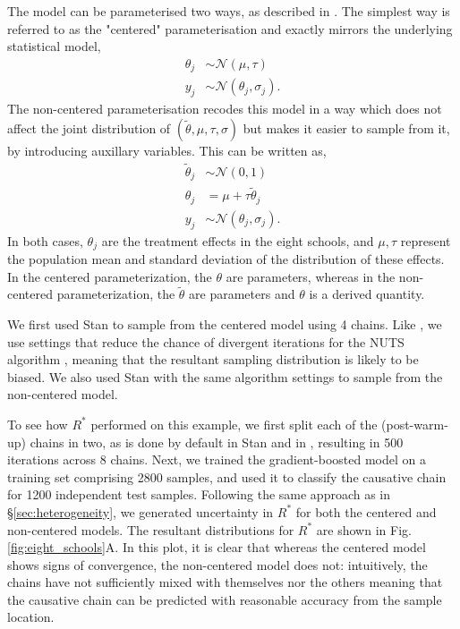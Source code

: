 \documentclass{article}
\newcommand{\N}{\mathcal{N}}
\begin{document}
The model can be parameterised two ways, as described in \cite{vehtari2019rank}. The simplest way is referred to as the "centered" parameterisation and exactly mirrors the underlying statistical model,
%
\begin{align*}
\theta_j &\sim \N(\mu, \tau) \\
y_j &\sim \N(\theta_j, \sigma_j).
\end{align*}
%
The non-centered parameterisation recodes this model in a way which does not affect the joint distribution of $(\tilde{\theta}, \mu, \tau, \sigma)$ but makes it easier to sample from it, by introducing auxillary variables. This can be written as,
%
\begin{align*}
\tilde{\theta}_j &\sim \N(0, 1) \\
\theta_j &= \mu + \tau \tilde{\theta}_j \\
y_j &\sim \N(\theta_j, \sigma_j).
\end{align*}
%
In both cases, $\theta_j$ are the treatment effects in the eight schools, and $\mu, \tau$ represent the population mean and standard deviation 
of the distribution of these effects. In the centered parameterization, the $\theta$ are parameters, whereas in the non-centered parameterization, the $\tilde{\theta}$ are parameters and $\theta$ is a derived quantity.

We first used Stan \cite{carpenter2017stan} to sample from the centered model using 4 chains. Like \cite{vehtari2019rank}, we use settings that reduce the chance of divergent iterations for the NUTS algorithm \cite{hoffman2014no}, meaning that the resultant sampling distribution is likely to be biased. We also used Stan with the same algorithm settings to sample from the non-centered model.

To see how $R^*$ performed on this example, we first split each of the (post-warm-up) chains in two, as is done by default in Stan \cite{carpenter2017stan} and in \cite{vehtari2019rank}, resulting in 500 iterations across 8 chains. Next, we trained the gradient-boosted model on a training set comprising 2800 samples, and used it to classify the causative chain for 1200 independent test samples. Following the same approach as in \S\ref{sec:heterogeneity}, we generated uncertainty in $R^*$ for both the centered and non-centered models. The resultant distributions for $R^*$ are shown in Fig.\ref{fig:eight_schools}A. In this plot, it is clear that whereas the centered model shows signs of convergence, the non-centered model does not: intuitively, the chains have not sufficiently mixed with themselves nor the others meaning that the causative chain can be predicted with reasonable accuracy from the sample location.
\end{document}
